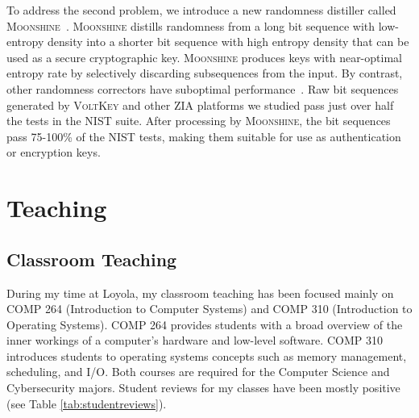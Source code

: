 \documentclass[10pt,onecolumn]{article}
\begin{document}
To address the second problem, we introduce a new randomness distiller called \textsc{Moonshine}~\cite{moonshine}.
\textsc{Moonshine} distills randomness from a long bit sequence with low-entropy density into a shorter bit sequence with high entropy density that can be used as a secure cryptographic key.
\textsc{Moonshine} produces keys with near-optimal entropy rate by selectively discarding subsequences from the input.
By contrast, other randomness correctors have suboptimal performance~\cite{drng}.
Raw bit sequences generated by \textsc{VoltKey} and other ZIA platforms we studied pass just over half the tests in the NIST suite.
After processing by \textsc{Moonshine}, the bit sequences pass 75-100\% of the NIST tests, making them suitable for use as authentication or encryption keys.



\section{Teaching}


\subsection{Classroom Teaching}

During my time at Loyola, my classroom teaching has been focused mainly on COMP 264 (Introduction to Computer Systems) and COMP 310 (Introduction to Operating Systems).
COMP 264 provides students with a broad overview of the inner workings of a computer's hardware and low-level software.
COMP 310 introduces students to operating systems concepts such as memory management, scheduling, and I/O.
Both courses are required for the Computer Science and Cybersecurity majors.
Student reviews for my classes have been mostly positive (see Table \ref{tab:studentreviews}).
\end{document}
